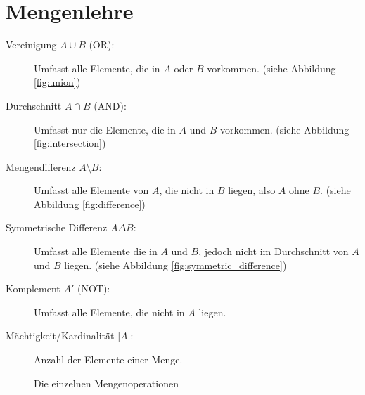 \section{Mengenlehre}
\label{sec:mengenlehre}
\begin{description}
    \item [Vereinigung $A\cup B$ (OR):]
        Umfasst alle Elemente, die in $A$ oder $B$ vorkommen. (siehe Abbildung \ref{fig:union})
    \item [Durchschnitt $A\cap B$ (AND):]
        Umfasst nur die Elemente, die in $A$ und $B$ vorkommen. (siehe Abbildung \ref{fig:intersection})
    \item [Mengendifferenz $A\setminus B$:]
        Umfasst alle Elemente von $A$, die nicht in $B$ liegen, also $A$ ohne $B$. (siehe Abbildung \ref{fig:difference})
    \item [Symmetrische Differenz $A\Delta B$:]
        Umfasst alle Elemente die in $A$ und $B$, jedoch nicht im Durchschnitt von $A$ und $B$ liegen. (siehe Abbildung \ref{fig:symmetric_difference})
    \item [Komplement $A'$ (NOT):]
        Umfasst alle Elemente, die nicht in $A$ liegen.
    \item [Mächtigkeit/Kardinalität $|A|$:]
        Anzahl der Elemente einer Menge.
\end{description}
\begin{figure}

    \label{fig:set}
    \caption{Die einzelnen Mengenoperationen}
\end{figure}


